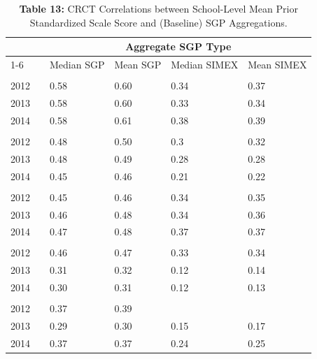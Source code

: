 \documentclass[12pt]{article}
\begin{document}
\begin{table}[H]
\caption*{\textbf{Table 13:} CRCT Correlations between School-Level Mean Prior Standardized Scale Score and (Baseline) SGP Aggregations.\label{table13}} 
\begin{center}
\begin{tabular}{lcllll}
\hline\hline
\multicolumn{1}{c}{\bfseries }&\multicolumn{1}{c}{\bfseries }&\multicolumn{4}{c}{\bfseries Aggregate SGP Type}\tabularnewline
\cline{1-6}
\multicolumn{1}{c}{Year}&\multicolumn{1}{c}{}&\multicolumn{1}{c}{Median SGP}&\multicolumn{1}{c}{Mean SGP}&\multicolumn{1}{c}{Median SIMEX}&\multicolumn{1}{c}{Mean SIMEX}\tabularnewline
\hline
&&&&&\tabularnewline
2012&&0.58&0.60&0.34&0.37\tabularnewline
2013&&0.58&0.60&0.33&0.34\tabularnewline
2014&&0.58&0.61&0.38&0.39\tabularnewline
\hline
&&&&&\tabularnewline
2012&&0.48&0.50&0.3&0.32\tabularnewline
2013&&0.48&0.49&0.28&0.28\tabularnewline
2014&&0.45&0.46&0.21&0.22\tabularnewline
\hline
&&&&&\tabularnewline
2012&&0.45&0.46&0.34&0.35\tabularnewline
2013&&0.46&0.48&0.34&0.36\tabularnewline
2014&&0.47&0.48&0.37&0.37\tabularnewline
\hline
&&&&&\tabularnewline
2012&&0.46&0.47&0.33&0.34\tabularnewline
2013&&0.31&0.32&0.12&0.14\tabularnewline
2014&&0.30&0.31&0.12&0.13\tabularnewline
\hline
&&&&&\tabularnewline
2012&&0.37&0.39&&\tabularnewline
2013&&0.29&0.30&0.15&0.17\tabularnewline
2014&&0.37&0.37&0.24&0.25\tabularnewline
\hline
\end{tabular}\end{center}

\end{table}
\end{document}
